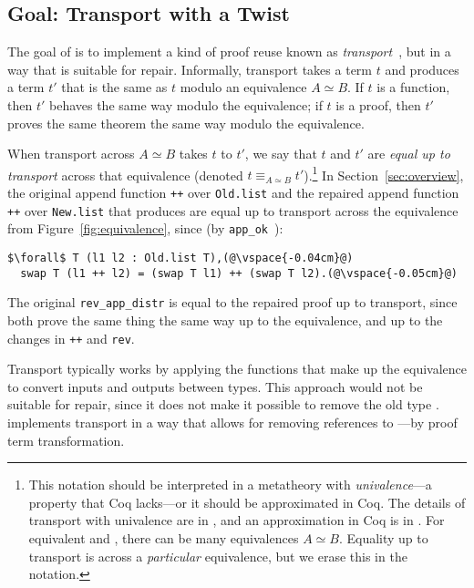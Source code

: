 \subsection{Goal: Transport with a Twist}
\label{sec:repair}

The goal of \toolname is to implement a kind of proof reuse known as \textit{transport}~\cite{univalent2013homotopy},
but in a way that is suitable for repair.
Informally, transport takes a term $t$ and produces a term $t'$ that is the same as $t$ modulo an equivalence $A \simeq B$.
If $t$ is a function, then $t'$ behaves the same way modulo the equivalence;
if $t$ is a proof, then $t'$ proves the same theorem the same way modulo the equivalence.

When transport across $A \simeq B$ takes $t$ to $t'$,
we say that $t$ and $t'$ are \textit{equal up to transport}
across that equivalence (denoted $t \equiv_{A \simeq B} t'$).\footnote{This notation should be interpreted in a metatheory with \textit{univalence}---a property that Coq lacks---or it should be approximated in Coq.
The details of transport with univalence are in \citet{univalent2013homotopy}, and an approximation in Coq is in \citet{tabareau2017equivalences}. For equivalent \A and \B, there can be many equivalences $A \simeq B$.
Equality up to transport is across a \textit{particular} equivalence, but we erase this in the 
notation.}
In Section~\ref{sec:overview}, the original append function \lstinline{++} over \lstinline{Old.list}
and the repaired append function \lstinline{++} over \lstinline{New.list} that \toolname produces are
equal up to transport across the equivalence from Figure~\ref{fig:equivalence}, since (by \lstinline{app_ok}~\href{https://github.com/uwplse/pumpkin-pi/blob/v2.0.0/plugin/coq/Swap.v}{}):

\begin{lstlisting}
$\forall$ T (l1 l2 : Old.list T),(@\vspace{-0.04cm}@)
  swap T (l1 ++ l2) = (swap T l1) ++ (swap T l2).(@\vspace{-0.05cm}@)
\end{lstlisting}
The original \lstinline{rev_app_distr} is equal to the repaired proof up to transport,
since both prove the same thing the same way up to the equivalence, and up to the changes in \lstinline{++}
and \lstinline{rev}.

Transport typically works by applying the functions that make up the equivalence to convert
inputs and outputs between types.
This approach would not be suitable for repair, since it does not make it possible to remove the old type \A.
\toolname implements transport in a way that allows for removing references to \A---by proof term transformation.

